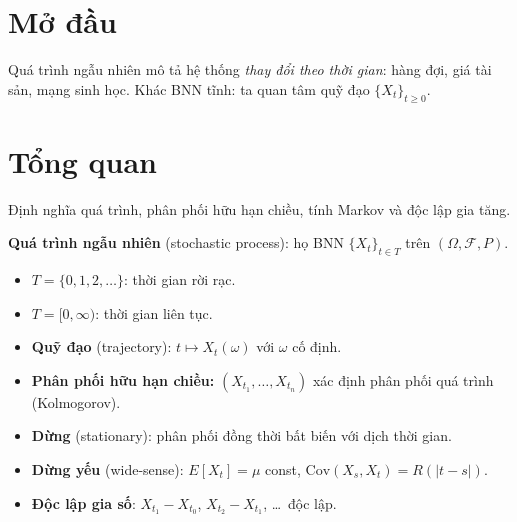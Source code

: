 \documentclass[12pt,a4paper]{article}
\begin{document}

\newpage
\tableofcontents
\newpage



\section{Mở đầu}

\begin{dongco}[title={Động cơ --- Mở đầu}]
Quá trình ngẫu nhiên mô tả hệ thống \emph{thay đổi theo thời gian}: hàng đợi, giá tài sản, mạng sinh học. Khác BNN tĩnh: ta quan tâm quỹ đạo $\{X_t\}_{t \ge 0}$.
\end{dongco}

\newpage

\section{Tổng quan}

\begin{dongco}[title={Động cơ --- Tổng quan}]
Định nghĩa quá trình, phân phối hữu hạn chiều, tính Markov và độc lập gia tăng.
\end{dongco}

\begin{dinhnghia}
  \textbf{Quá trình ngẫu nhiên} (stochastic process): họ BNN $\{X_t\}_{t \in T}$ trên $(\Omega, \mathcal{F}, P)$.
  \begin{itemize}
    \item $T = \{0, 1, 2, \ldots\}$: thời gian rời rạc.
    \item $T = [0, \infty)$: thời gian liên tục.
    \item \textbf{Quỹ đạo} (trajectory): $t \mapsto X_t(\omega)$ với $\omega$ cố định.
    \item \textbf{Phân phối hữu hạn chiều:} $(X_{t_1}, \ldots, X_{t_n})$ xác định phân phối quá trình (Kolmogorov).
  \end{itemize}
\end{dinhnghia}

\begin{dinhnghia}[title={Phân loại}]
  \begin{itemize}
    \item \textbf{Dừng} (stationary): phân phối đồng thời bất biến với dịch thời gian.
    \item \textbf{Dừng yếu} (wide-sense): $E[X_t] = \mu$ const, $\text{Cov}(X_s, X_t) = R(|t-s|)$.
    \item \textbf{Độc lập gia số}: $X_{t_1} - X_{t_0}$, $X_{t_2} - X_{t_1}$, \ldots\ độc lập.
  \end{itemize}
\end{dinhnghia}
\end{document}
